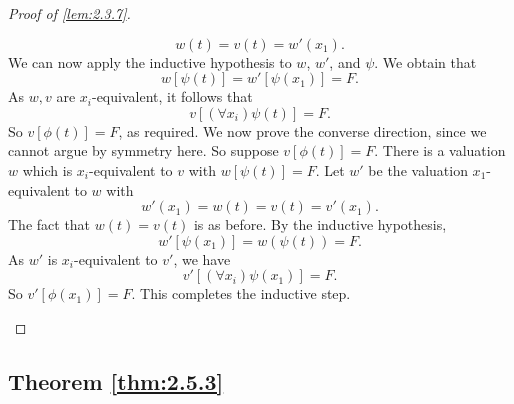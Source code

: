 \documentclass{article}
\newcommand{\rb}[1]{\left( #1 \right)}
\renewcommand{\sb}[1]{\left[ #1 \right]}
\newcommand{\fab}[1]{\rb{\forall #1}}
\theoremstyle{definition}\newtheorem{definition}{Definition}[subsection]
\theoremstyle{definition}\newtheorem{remark1}[definition]{Remark}
\theoremstyle{definition}\newtheorem{example1}[definition]{Example}
\theoremstyle{definition}\newtheorem*{remark2}{Remark}
\theoremstyle{definition}\newtheorem*{example2}{Example}
\theoremstyle{definition}\newtheorem*{note}{Note}
\theoremstyle{definition}\newtheorem*{notation}{Notation}
\begin{document}
\begin{proof}[Proof of \ref{lem:2.3.7}]
\begin{itemize}
$$ w\rb{t} = v\rb{t} = w'\rb{x_1}. $$
We can now apply the inductive hypothesis to $ w $, $ w' $, and $ \psi $. We obtain that
$$ w\sb{\psi\rb{t}} = w'\sb{\psi\rb{x_1}} = F. $$
As $ w, v $ are $ x_i $-equivalent, it follows that
$$ v\sb{\fab{x_i}\psi\rb{t}} = F. $$
So $ v\sb{\phi\rb{t}} = F $, as required. We now prove the converse direction, since we cannot argue by symmetry here. So suppose $ v\sb{\phi\rb{t}} = F $. There is a valuation $ w $ which is $ x_i $-equivalent to $ v $ with $ w\sb{\psi\rb{t}} = F $. Let $ w' $ be the valuation $ x_1 $-equivalent to $ w $ with
$$ w'\rb{x_1} = w\rb{t} = v\rb{t} = v'\rb{x_1}. $$
The fact that $ w\rb{t} = v\rb{t} $ is as before. By the inductive hypothesis,
$$ w'\sb{\psi\rb{x_1}} = w\rb{\psi\rb{t}} = F. $$
As $ w' $ is $ x_i $-equivalent to $ v' $, we have
$$ v'\sb{\fab{x_i}\psi\rb{x_1}} = F. $$
So $ v'\sb{\phi\rb{x_1}} = F $. This completes the inductive step.
\end{itemize}
\end{proof}

\pagebreak

\subsection{Theorem \ref{thm:2.5.3}}
\end{document}
